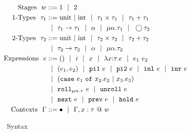 \begin{figure}
\centering
$\begin{aligned}
\text{Stages}\ \ 
\world &::= \bbone \gbar \bbtwo \\
\text{\bbone-Types}\ \ 
\type_1 &::= \text{unit}~|~\text{int}%
 \gbar \type_1 \times \type_1
 \gbar \type_1 + \type_1 \\
&\gbar \type_1 \to \type_1
 \gbar \alpha \gbar \mu \alpha.\tau_1
 \gbar \fut \type_2 \\
\text{\bbtwo-Types}\ \ 
\type_2 &::= \text{unit}~|~\text{int}%
 \gbar \type_2 \times \type_2
 \gbar \type_2 + \type_2 \\
&\gbar \type_2 \to \type_2
 \gbar \alpha \gbar \mu \alpha.\tau_2 \\
\text{Expressions}\ \ 
\expr &::= ()\gbar\inte\gbar\var%
 \gbar \lam{\var}{\type}{\expr} 
 \gbar \expr_1~\expr_2 \\
&\gbar (\expr_1, \expr_2) 
 \gbar \pio~\expr 
 \gbar \pit~\expr
 \gbar \inl~\expr 
 \gbar \inr~\expr \\
&\gbar (\caseof {\expr_1}{\var_2.\expr_2}{\var_3.\expr_3})
\\ %
&\gbar \roll_{\mu \alpha.\tau}~e
 \gbar \unroll~e\\
&\gbar \next~\expr 
 \gbar \prev~\expr 
 \gbar \pause~\expr \\
\text{Contexts}\ \ 
\context &::=\emptyC \gbar \context, \colwor \var \type
\end{aligned} $
\caption{\lang~Syntax}
\label{fig:grammar}
\end{figure}

